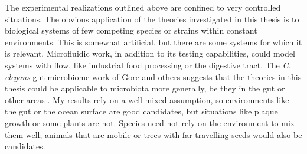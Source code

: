 The experimental realizations outlined above are confined to very controlled situations. 
The obvious application of the theories investigated in this thesis is to biological systems of few competing species or strains within constant environments. %
This is somewhat artificial, but there are some systems for which it is relevant. 
Microfluidic work, in addition to its testing capabilities, could model systems with flow, like industrial food processing or the digestive tract. 
The \emph{C. elegans} gut microbiome work of Gore and others \cite{Vega2017,Roeselers2011} suggests that the theories in this thesis could be applicable to microbiota more generally, be they in the gut or other areas \cite{Manichanh2010,Koenig2011,Theriot2014,Wolfe2014,Fisher2015,Coburn2015,Datta2016}. 
My results rely on a well-mixed assumption, so environments like the gut or the ocean surface are good candidates, but situations like plaque growth \cite{Xavier2007} or some plants \cite{Shmida1984} are not. %
Species need not rely on the environment to mix them well; animals that are mobile or trees with far-travelling seeds would also be candidates. 
\fi

